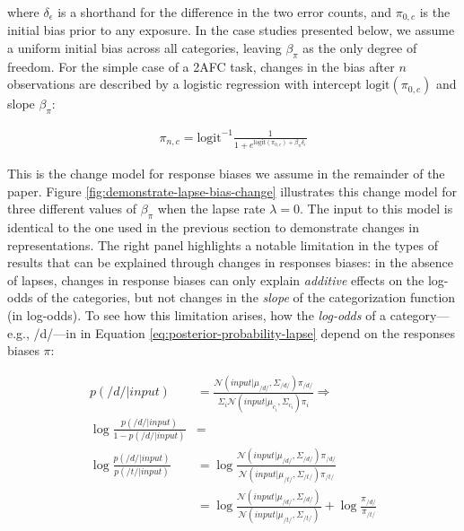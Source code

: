 \documentclass[
  11pt,
  man,floatsintext]{apa6}
\begin{document}
where \(\delta_\epsilon\) is a shorthand for the difference in the two error counts, and \(\pi_{0,c}\) is the initial bias prior to any exposure. In the case studies presented below, we assume a uniform initial bias across all categories, leaving \(\beta_{\pi}\) as the only degree of freedom. For the simple case of a 2AFC task, changes in the bias after \(n\) observations are described by a logistic regression with intercept \(\mathrm{logit}(\pi_{0,c})\) and slope \(\beta_{\pi}\):

\begin{equation}\label{eq:bias-probability}
\begin{split}
\pi_{n,c} = \mathrm{logit}^{-1}\frac{1}{1+ e^{\mathrm{logit}(\pi_{0,c}) + \beta_{\pi} \delta_{\epsilon}}}
\end{split}
\end{equation}

This is the change model for response biases we assume in the remainder of the paper. Figure \ref{fig:demonstrate-lapse-bias-change} illustrates this change model for three different values of \(\beta_\pi\) when the lapse rate \(\lambda=0\). The input to this model is identical to the one used in the previous section to demonstrate changes in representations. The right panel highlights a notable limitation in the types of results that can be explained through changes in responses biases: in the absence of lapses, changes in response biases can only explain \emph{additive} effects on the log-odds of the categories, but not changes in the \emph{slope} of the categorization function (in log-odds). To see how this limitation arises, how the \emph{log-odds} of a category---e.g., /d/---in in Equation \eqref{eq:posterior-probability-lapse} depend on the responses biases \(\pi\):

\begin{equation}\label{eq:posterior-probability-lapse-PR}
\begin{split}
p(/d/ | input) & = \frac{\mathcal{N}\!\left( input | \mu_{/d/}, \Sigma_{/d/} \right) \pi_{/d/}}{\Sigma_i \mathcal{N}\!\left( input | \mu_{c_i}, \Sigma_{c_i}\right) \pi_i} \Rightarrow \\
\log \frac{p(/d/ | input)}{1 - p(/d/ | input)} & =  \\
\log \frac{p(/d/ | input)}{p(/t/ | input)} & =  \log \frac{\mathcal{N}\!\left( input | \mu_{/d/}, \Sigma_{/d/} \right) \pi_{/d/}}{\mathcal{N}\!\left( input | \mu_{/t/}, \Sigma_{/t/} \right) \pi_{/t/}} \\
 & = \log \frac{\mathcal{N}\!\left( input | \mu_{/d/}, \Sigma_{/d/} \right)}{\mathcal{N}\!\left( input | \mu_{/t/}, \Sigma_{/t/} \right)} + \log\frac{\pi_{/d/}}{\pi_{/t/}}
\end{split}
\end{equation}
\end{document}
